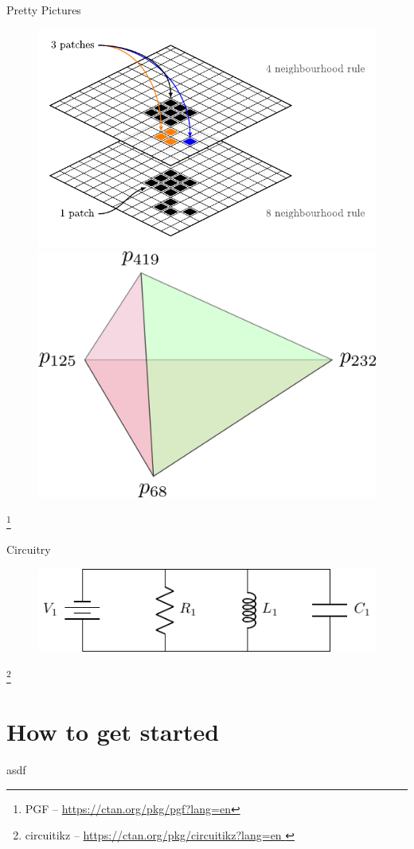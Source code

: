 \documentclass[aspectratio=169]{beamer}
\newcommand\blfootnote[1]{%
	\begingroup
	\renewcommand\thefootnote{}\footnote{#1}%
	\addtocounter{footnote}{-1}%
	\endgroup
}
\begin{document}
\begin{frame}{\insertsection}{Pretty Pictures}
	\begin{figure}
		\includegraphics[width=0.35\linewidth]{./Images/Neighbourhood_definition2.pdf}
		\hspace{5em}
		\includegraphics[width=0.35\linewidth]{./Images/nicePic.png}
	\end{figure}
	\blfootnote{PGF -- \url{https://ctan.org/pkg/pgf?lang=en}}
\end{frame}

\begin{frame}{\insertsection}{Circuitry}
	\begin{figure}
		\includegraphics[width=0.7\linewidth]{./LaTex_Tikz/circuitikz.pdf}
	\end{figure}
	\blfootnote{circuitikz -- \url{https://ctan.org/pkg/circuitikz?lang=en
	}}
\end{frame}

\section{How to get started}
\begin{frame}
	asdf
\end{frame}
\end{document}
